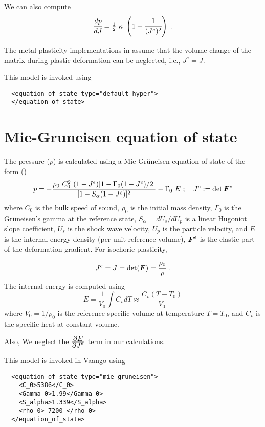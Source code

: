 We can also compute
\begin{equation}
  \cfrac{dp}{dJ} = \tfrac{1}{2}~\kappa~\left(1 + \cfrac{1}{(J^e)^2}\right) ~.
\end{equation}

The metal plasticity implementations in \Vaango assume that the volume
change of the matrix during plastic deformation can be neglected, i.e., $J^e = J$.

This model is invoked using
\lstset{language=XML}
\begin{lstlisting}
  <equation_of_state type="default_hyper">
  </equation_of_state>
\end{lstlisting}

\section{Mie-Gruneisen equation of state}
The pressure ($p$) is calculated using a Mie-Gr{\"u}neisen equation of state 
of the form (\cite{Wilkins1999,Zocher2000})
\begin{equation} \label{eq:EOSMG_upd}
  p =  - \frac{\rho_0~C_0^2~(1 - J^e)
           [1 - \Gamma_0 (1 - J^e)/2]}
           {[1 - S_{\alpha}(1 - J^e)]^2} - \Gamma_0~E 
  ~;~~~ J^e := \det{\ensuremath{\boldsymbol{F}}^e} 
\end{equation}
where $C_0$ is the bulk speed of sound, $\rho_0$ is the initial mass density,
$\Gamma_0$ is the Gr{\"u}neisen's gamma at the reference state,
$S_{\alpha} = dU_s/dU_p$ is a linear Hugoniot slope coefficient,
$U_s$ is the shock wave velocity, $U_p$ is the particle velocity, and
$E$ is the internal energy density (per unit reference volume), $\boldsymbol{F}^e$ is
the elastic part of the deformation gradient.  For isochoric plasticity,
\begin{equation*}
  J^e = J = \det(\boldsymbol{F}) = \cfrac{\rho_0}{\rho} ~.
\end{equation*}
  The internal energy is computed using
  \begin{equation}
    E = \frac{1}{V_0} \int C_v dT \approx \frac{C_v (T-T_0)}{V_0}
  \end{equation}
  where $V_0 = 1/\rho_0$ is the reference specific volume at temperature 
  $T = T_0$, and $C_v$ is the specific heat at constant volume.

Also,
\Beq
\Eeq
We neglect the $\frac{\displaystyle\partial E}{\displaystyle\partial J^e}$ term in our calculations.

This model is invoked in Vaango using
\lstset{language=XML}
\begin{lstlisting}
  <equation_of_state type="mie_gruneisen">
    <C_0>5386</C_0>
    <Gamma_0>1.99</Gamma_0>
    <S_alpha>1.339</S_alpha>
    <rho_0> 7200 </rho_0>
  </equation_of_state>
\end{lstlisting}


